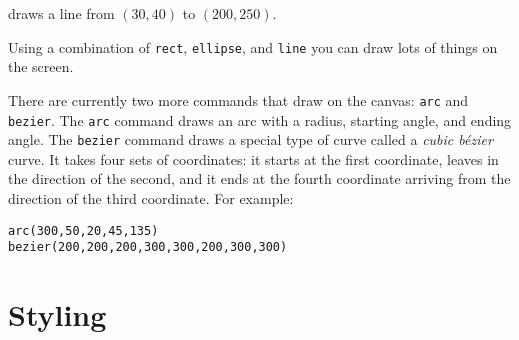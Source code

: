 \documentclass[
  xhtml,%
  use filename%
]{internet}
\begin{document}
draws a line from \((30,40)\) to \((200,250)\).

Using a combination of \verb+rect+, \verb+ellipse+, and \verb+line+ you can draw lots of things on the screen.

There are currently two more commands that draw on the canvas: \verb+arc+ and \verb+bezier+.
The \verb+arc+ command draws an arc with a radius, starting angle, and ending angle.
The \verb+bezier+ command draws a special type of curve called a \emph{cubic b\'ezier} curve.
It takes four sets of coordinates: it starts at the first coordinate, leaves in the direction of the second, and it ends at the fourth coordinate arriving from the direction of the third coordinate.
For example:

\begin{verbatim}
arc(300,50,20,45,135)
bezier(200,200,200,300,300,200,300,300)
\end{verbatim}

\section{Styling}
\end{document}
